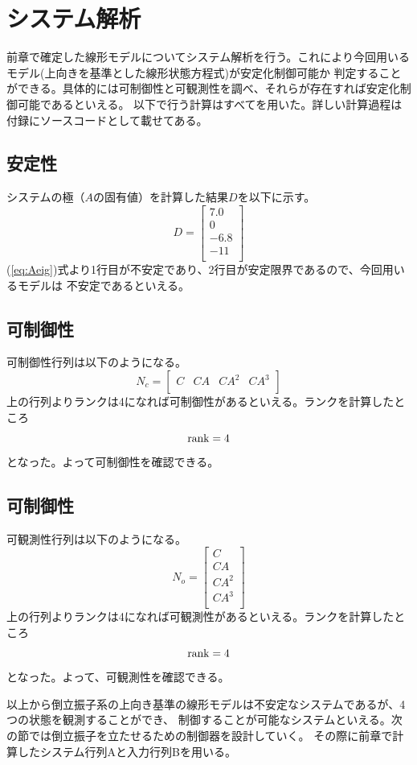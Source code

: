 \section{システム解析}
	前章で確定した線形モデルについてシステム解析を行う。これにより今回用いるモデル(上向きを基準とした線形状態方程式)が安定化制御可能か
	判定することができる。具体的には可制御性と可観測性を調べ、それらが存在すれば安定化制御可能であるといえる。
	以下で行う計算はすべて\MaTX{}を用いた。詳しい計算過程は付録にソースコードとして載せてある。
	\subsection{安定性}
		システムの極（$A$の固有値）を計算した結果$D$を以下に示す。
		\begin{equation}
			D=\left[
			\begin{array}{c}
				7.0\\
				0\\
				-6.8\\
				-11\\
			\end{array}
			\right]
			\label{eq:Aeig}
		\end{equation}
		(\ref{eq:Aeig})式より1行目が不安定であり、2行目が安定限界であるので、今回用いるモデルは
		不安定であるといえる。
	\subsection{可制御性}
		可制御性行列は以下のようになる。
		\[
			N_{c} = \left[
			\begin{array}{cccc}
				C & CA & CA^{2} & CA^{3} \\
			\end{array}
			\right]
		\]
		上の行列よりランクは4になれば可制御性があるといえる。ランクを計算したところ
		\[
			\rm{rank}  = 4
		\]
		となった。よって可制御性を確認できる。\\
	\subsection{可制御性}
		可観測性行列は以下のようになる。
		\[
			N_{o} = \left[
			\begin{array}{c}
				C\\
				CA\\
				CA^{2}\\
				CA^{3}\\
			\end{array}
			\right]
		\]
		上の行列よりランクは4になれば可観測性があるといえる。ランクを計算したところ
		\[
			\rm{rank} = 4
		\]
		となった。よって、可観測性を確認できる。\\
	\par
	以上から倒立振子系の上向き基準の線形モデルは不安定なシステムであるが、4つの状態を観測することができ、
	制御することが可能なシステムといえる。次の節では倒立振子を立たせるための制御器を設計していく。
	その際に前章で計算したシステム行列Aと入力行列Bを用いる。
		
